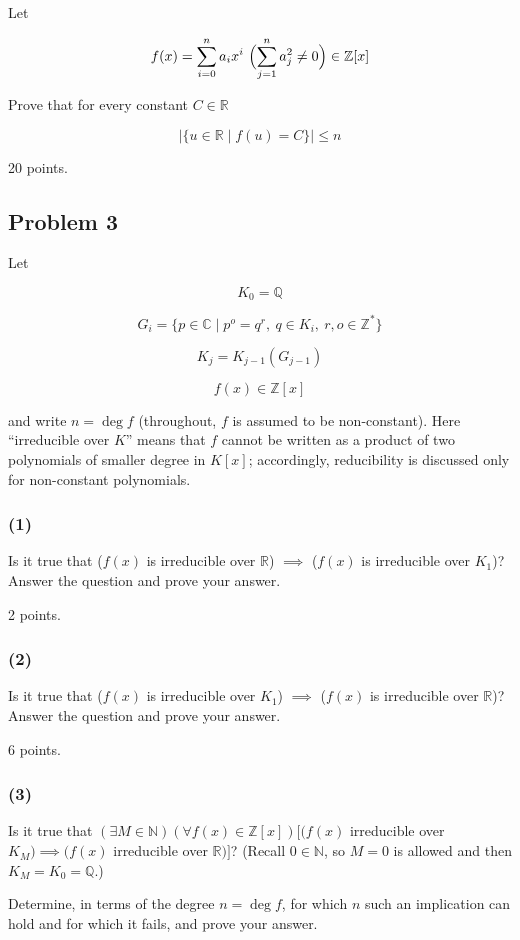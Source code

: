 \documentclass[11pt,a4paper]{article}
\begin{document}
Let

$$f(x)=\sum_{i=0}^n a_i x^i\ \Bigl(\sum_{j=1}^n a_j^2\neq 0\Bigr)\in \mathbb{Z}[x]$$

Prove that for every constant $C\in \mathbb{R}$

$${\lvert\{u \in \mathbb{R}\mid f(u) = C\}\rvert\leq n}$$

20 points.

\subsection{Problem 3}

Let

$$K_0=\mathbb{Q}$$

$$G_i=\{p\in \mathbb{C}\mid p^o=q^r,\ q\in K_i,\ r,o\in \mathbb{Z}^*\}$$

$$K_j=K_{j-1}(G_{j-1})$$

$$f(x)\in \mathbb{Z}[x]$$

and write $n=\deg f$ (throughout, $f$ is assumed to be non-constant). Here
``irreducible over $K$'' means that $f$ cannot be written as a product of two
polynomials of smaller degree in $K[x]$; accordingly, reducibility is
discussed only for non-constant polynomials.

\subsubsection{(1)}
Is it true that ($f(x)$ is irreducible over $\mathbb{R}$) $\implies$
($f(x)$ is irreducible over $K_1$)? Answer the question and prove your answer.

2 points.

\subsubsection{(2)}
Is it true that ($f(x)$ is irreducible over $K_1$) $\implies$
($f(x)$ is irreducible over $\mathbb{R}$)? Answer the question and prove your
answer.

6 points.

\subsubsection{(3)}
Is it true that
$(\exists M \in \mathbb{N})(\forall f(x) \in \mathbb{Z}[x])[(f(x)$
irreducible over $K_M) \implies (f(x)$ irreducible over
$\mathbb{R})]$?
(Recall $0\in\mathbb{N}$, so $M=0$ is allowed and then
$K_M=K_0=\mathbb{Q}$.)

Determine, in terms of the degree $n=\deg f$, for which $n$ such an
implication can hold and for which it fails, and prove your answer.
\end{document}
